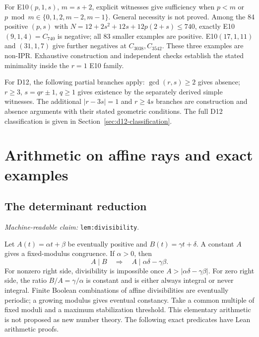 \documentclass[11pt]{amsart}
\newcommand{\record}[1]{\nolinkurl{#1}}
\newcommand{\claimid}[1]{\par\nopagebreak\noindent\textit{Machine-readable claim:} \record{#1}.\par}
\theoremstyle{definition}\newtheorem{definition}{Definition}
\begin{document}
For E10$(p,1,s)$, $m=s+2$, explicit witnesses give
sufficiency when $p<m$ or
$p\bmod m\in\{0,1,2,m-2,m-1\}$. General necessity is not proved.
Among the 84 positive $(p,s)$ with
$N=12+2s^2+12s+12p(2+s)\le740$, exactly E10$(9,1,4)=C_{740}$
is negative; all 83 smaller examples are positive. E10$(17,1,11)$
and $(31,1,7)$ give further negatives at $C_{3038},C_{3542}$.
These three examples are non-IPR. Exhaustive construction and
independent checks establish the stated minimality inside the $r=1$
E10 family.

For D12, the following partial branches apply:
$\gcd(r,s)\ge2$ gives absence; $r\ge3$, $s=qr\pm1$, $q\ge1$
gives existence by the separately derived simple witnesses. The
additional $|r-3s|=1$ and $r\ge4s$ branches are construction and
absence arguments with their stated geometric conditions. The full D12 classification is given in Section~\ref{sec:d12-classification}.

\section{Arithmetic on affine rays and exact examples}\label{sec:arithmetic}
\subsection{The determinant reduction}\label{lem:divisibility}
\claimid{lem:divisibility}
Let $A(t)=\alpha t+\beta$ be eventually positive and
$B(t)=\gamma t+\delta$. A constant $A$ gives a fixed-modulus
congruence. If $\alpha>0$, then
\begin{equation}\label{eq:determinant}
 A\mid B\quad\Longrightarrow\quad A\mid\alpha\delta-\gamma\beta.
\end{equation}
For nonzero right side, divisibility is impossible once
$A>|\alpha\delta-\gamma\beta|$. For zero right side, the ratio
$B/A=\gamma/\alpha$ is constant and is either always integral or
never integral. Finite Boolean combinations of affine divisibilities
are eventually periodic; a growing modulus gives eventual constancy.
Take a common multiple of fixed moduli and a maximum stabilization
threshold. This elementary arithmetic is not proposed as new number
theory. The following exact predicates have Lean arithmetic proofs.
\end{document}
